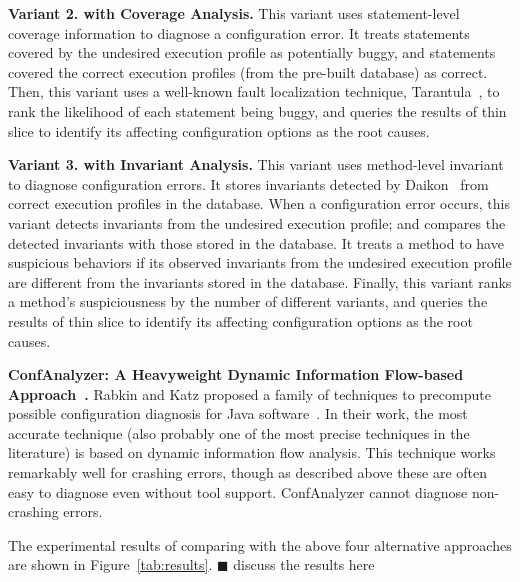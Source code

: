 \vspace{1mm}
\noindent \textbf{Variant 2. \ourtool with Coverage Analysis.}
This variant uses statement-level coverage information
to diagnose a configuration error. It treats statements covered
by the undesired execution profile as potentially buggy, and statements
covered the correct execution profiles (from the pre-built database) as correct.
Then, this variant uses a well-known fault localization technique,
Tarantula~\cite{Jones:2002}, to rank the likelihood of each
statement being buggy, and queries the results of thin slice
to identify its affecting configuration options as the root causes. 


\vspace{1mm}
\noindent \textbf{Variant 3. \ourtool with Invariant Analysis.}
This variant uses method-level invariant
to diagnose configuration errors. It stores invariants detected
by Daikon~\cite{Ernst:1999} from correct execution profiles in the database. When a configuration
error occurs, this variant detects invariants from the undesired execution profile;
and compares the detected invariants
with those stored in the database.
It treats a method to have suspicious behaviors if its observed invariants
from the undesired execution profile are different from the invariants stored in the database. Finally, this variant ranks
a method's suspiciousness by the number of different variants, and
queries the results of thin slice
to identify its affecting configuration options as the root causes. 

\vspace{1mm}
\noindent \textbf{ConfAnalyzer: A Heavyweight Dynamic Information Flow-based Approach~\cite{Rabkin:2011:PPC}.}
Rabkin and Katz proposed a family of techniques to precompute possible
configuration diagnosis for Java software~\cite{Rabkin:2011:PPC}. In their work,
the most accurate technique (also probably one of the most precise techniques in the literature)
is based on dynamic information flow analysis.
This technique works remarkably well for crashing errors, though as
described above these are often easy to diagnose even without tool
support.  ConfAnalyzer cannot diagnose non-crashing errors.


\vspace{1mm}

The experimental results of comparing \ourtool with the above
four alternative approaches are shown in Figure~\ref{tab:results}.
$\blacksquare$ discuss the results here



